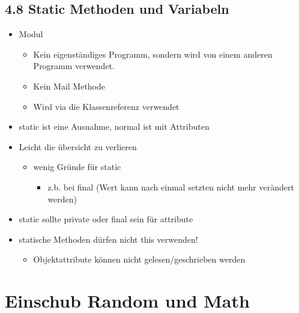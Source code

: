 \documentclass[11pt]{article}
\begin{document}
\subsection{4.8 Static Methoden und Variabeln}
\label{sec:org6c94181}
\begin{itemize}
\item Modul\\
\begin{itemize}
\item Kein eigenständiges Programm, sondern wird von einem anderen Programm verwendet.\\
\item Kein Mail Methode\\
\item Wird via die Klassenreferenz verwendet\\
\end{itemize}
\item static ist eine Ausnahme, normal ist mit Attributen\\
\item Leicht die übersicht zu verlieren\\
\begin{itemize}
\item wenig Gründe für static\\
\begin{itemize}
\item z.b. bei final (Wert kann nach einmal setzten nicht mehr verändert werden)\\
\end{itemize}
\end{itemize}
\item static sollte private oder final sein für attribute\\
\item statische Methoden dürfen nicht this verwenden!\\
\begin{itemize}
\item Objektattribute können nicht gelesen/geschrieben werden\\
\end{itemize}
\end{itemize}


\section{Einschub Random und Math}
\label{sec:orgd1e74f4}
\end{document}
